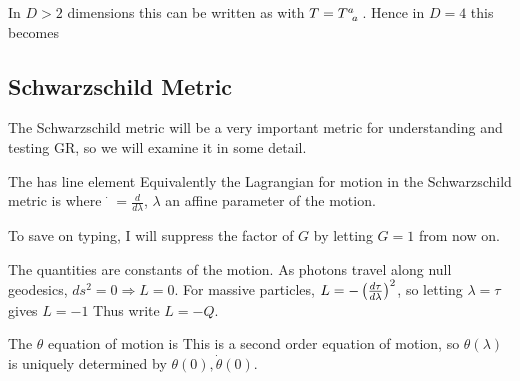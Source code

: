 \documentclass{article}
\begin{document}
\begin{prop}
In $D>2$ dimensions this can be written as 
with $T=T\indices{^a_a}$. Hence 
in $D=4$ this becomes 
\end{prop}

\subsection{Schwarzschild Metric}
The Schwarzschild metric will be a very important metric for understanding and testing GR, so we will examine it in some detail. 
\begin{definition}
The  has line element 
Equivalently the Lagrangian for motion in the Schwarzschild metric is 
where $\dot{\phantom{r}} = \frac{d}{d\lambda}$, $\lambda$ an affine parameter of the motion. 
\end{definition}
To save on typing, I will suppress the factor of $G$ by letting $G=1$ from now on. 
\begin{lemma}
The quantities 
are constants of the motion. As photons travel along null geodesics, $ds^2 = 0 \Rightarrow L=0$. For massive particles, $L = -\left( \frac{d\tau}{d\lambda} \right)^2$, so letting $\lambda = \tau$ gives $L=-1$ Thus write $L = -Q$.
\end{lemma}
\begin{lemma}
The $\theta$ equation of motion is 
This is a second order equation of motion, so $\theta(\lambda)$ is uniquely determined by $\theta(0),\dot{\theta}(0)$. 
\end{lemma}
\end{document}
